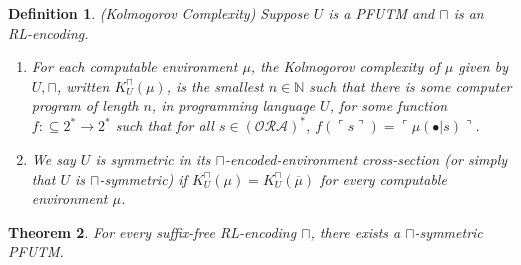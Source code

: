 \documentclass[runningheads]{llncs}
\newtheorem{mytheorem}{Theorem}
\newtheorem{mydefinition}[mytheorem]{Definition}
\begin{document}
\begin{mydefinition}
(Kolmogorov Complexity)
Suppose $U$ is a PFUTM and $\sqcap$ is an RL-encoding.
\begin{enumerate}
    \item
    For each computable environment $\mu$, the \emph{Kolmogorov complexity of $\mu$
    given by $U,\sqcap$}, written $K^\sqcap_U(\mu)$,
    is the smallest $n\in\mathbb N$ such that
    there is some computer program of length $n$, in programming language $U$,
    for some function $f:\subseteq 2^*\to 2^*$ such that
    for all $s\in (\mathcal O\mathcal R\mathcal A)^*$,
    $f(\ulcorner s\urcorner)=\ulcorner \mu(\bullet|s)\urcorner$.
    \item
    We say $U$ is \emph{symmetric in its $\sqcap$-encoded-environment
    cross-section} (or simply that $U$ is \emph{$\sqcap$-symmetric}) if
    $K^\sqcap_U(\mu)=K^\sqcap_U(\overline\mu)$ for every computable environment $\mu$.
\end{enumerate}
\end{mydefinition}

\begin{mytheorem}
\label{envirosymmetricexistencelemma}
    For every suffix-free RL-encoding $\sqcap$,
    there exists a $\sqcap$-symmetric PFUTM.
\end{mytheorem}
\end{document}
